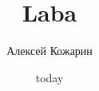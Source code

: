 \documentclass[a4paper,12pt]{article}
\title{Laba}
\author{Алексей Кожарин}
\date{today}
\begin{document}

\renewcommand{\baselinestretch}{1.3}





%
%
\end{document}
